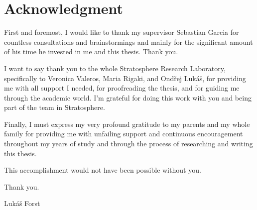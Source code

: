 \vspace*{\fill}

\section*{Acknowledgment}
First and foremost, I would like to thank my supervisor Sebastian Garcia for countless consultations and brainstormings and mainly for the significant amount of his time he invested in me and this thesis. Thank you.

I want to say thank you to the whole Stratosphere Research Laboratory, specifically to Veronica Valeros, Maria Rigaki, and Ondřej Lukáš, for providing me with all support I needed, for proofreading the thesis, and for guiding me through the academic world.
I'm grateful for doing this work with you and being part of the team in Stratosphere.

Finally, I must express my very profound gratitude to my parents and my whole family for providing me with unfailing support and continuous encouragement throughout my years of study and through the process of researching and writing this thesis. 

\bigskip \noindent
This accomplishment would not have been possible without you.
  
\bigskip \noindent
Thank you.
  
\bigskip \noindent
\hfill Lukáš Forst

\thispagestyle{empty}

\cleardoublepage